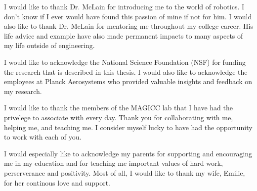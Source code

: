 \afterpage{\cleardoublepage}
%
I would like to thank Dr. McLain for introducing me to the world of robotics. I
don't know if I ever would have found this passion of mine if not for him. I would also
like to thank Dr. McLain for mentoring me throughout my college career. His life
advice and example have also made permanent impacts to many
aspects of my life outside of engineering.

I would like to acknowledge the National Science Foundation (NSF) for funding
the research that is described in this thesis. I would also like to acknowledge
the employees at Planck Aerosystems who provided valuable insights and feedback
on my research.

I would like to thank the members of the MAGICC lab that I
have had the privelege to associate with every day. Thank you for collaborating
with me, helping me, and teaching me. I consider myself lucky to have had the
opportunity to work with each of you.

I would especially like to acknowledge my parents for supporting and
encouraging me in my education and for teaching me important values of hard
work, perserverance and positivity. Most of all, I would like to thank my wife, Emilie, for
her continous love and support.
